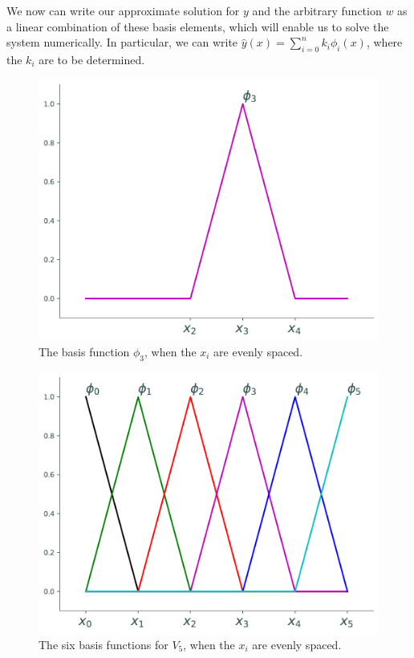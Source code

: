 We now can write our approximate solution for \(y\) and the arbitrary function \(w\) as a linear combination of these basis elements, which will enable us to solve the system numerically.
In particular, we can write \(\hat{y}(x)=\sum_{i=0}^n k_i \phi_i(x)\), where the \(k_i\) are to be determined.

\begin{figure}[ht]
\centering
\includegraphics[width=\textwidth]{figures/one_basis_function.pdf}
\caption{The basis function $\phi_3$, when the \(x_i\) are evenly spaced.}
\label{fig:FEM_one_basis_function}
\end{figure}

\begin{figure}[ht]
\centering
\includegraphics[width=\textwidth]{figures/basis_functions.pdf}
\caption{The six basis functions for $V_5$, when the \(x_i\) are evenly spaced.}
\label{fig:FEM_basis_functions}
\end{figure}

